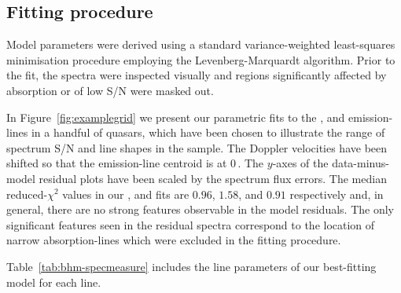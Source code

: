 \subsection{Fitting procedure}

Model parameters were derived using a standard variance-weighted least-squares minimisation procedure employing the Levenberg-Marquardt algorithm. 
Prior to the fit, the spectra were inspected visually and regions significantly affected by absorption or of low S/N were masked out.

In Figure~\ref{fig:examplegrid} we present our parametric fits to the , \ha and \hb emission-lines in a handful of quasars, which have been chosen to illustrate the range of spectrum S/N and line shapes in the sample.  
The Doppler velocities have been shifted so that the \ha emission-line centroid is at $0$\,\kms. 
The $y$-axes of the data-minus-model residual plots have been scaled by the spectrum flux errors.
The median reduced-$\chi^2$ values in our \hans, \hb and  fits are $0.96$, $1.58$, and $0.91$ respectively and, in general, there are no strong features observable in the model residuals. 
The only significant features seen in the residual  spectra correspond to the location of narrow absorption-lines which were excluded in the fitting procedure.

Table~\ref{tab:bhm-specmeasure} includes the line parameters of our best-fitting model for each line.


